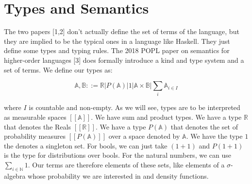 \documentclass[11pt]{article}
\theoremstyle{definition}
\theoremstyle{plain}
\renewcommand{\b}[1]{\mathbb{#1}}
\begin{document}



\section{Types and Semantics}

\noindent The two papers [1,2] don't actually define the set of terms of the language,
but they are implied to be the typical ones in a language like Haskell. They just define
some types and typing rules. The 2018 POPL paper on semantics for higher-order languages [3] 
does formally introduce a kind and type system and a set of terms. We define our types as:

$$ \b{A},\b{B} ::= 
    \b{R} | P(\b{A}) | 1 | \b{A} \times \b{B} | \sum_i \b{A}_{i \in I} $$

\noindent where $I$ is countable and non-empty. As we will see, 
types are to be interpreted as measurable spaces $[[\b{A}]]$. 
We have sum and product types. We have a type $\b{R}$ that denotes the Reals $[[\b{R}]]$. 
We have a type $P(\b{A})$ that denotes the set of probability measures $[[P(\b{A})]]$
over a space denoted by $\b{A}$. We have the type $1$ the denotes a singleton set. 
For bools, we can just take $(1+1)$ and $P(1+1)$ is the type for distributions over bools.
For the natural numbers, we can use $\sum_{i \in \b{N}} 1$. Our terms are therefore
elements of these sets, like elements of a $\sigma$-algebra whose probability
we are interested in and density functions. \\
\end{document}
